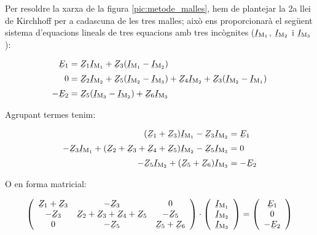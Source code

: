 Per resoldre la xarxa de la figura \vref{pic:metode_malles}, hem de plantejar la 2a llei de Kirchhoff per a cadascuna de les tres malles; això ens proporcionarà el següent sistema d'equacions lineals de tres equacions amb tres incògnites ($\cmplx{I}\ped{M_1}$, $\cmplx{I}\ped{M_2}$ i $\cmplx{I}\ped{M_3}$):

\begin{subequations}
\begin{align}
    \cmplx{E}_1 &= \cmplx{Z}_1 \cmplx{I}\ped{M_1} + \cmplx{Z}_3 (\cmplx{I}\ped{M_1}-\cmplx{I}\ped{M_2}) \\[0.5ex]
    0 &= \cmplx{Z}_2 \cmplx{I}\ped{M_2} + \cmplx{Z}_5(\cmplx{I}\ped{M_2}-\cmplx{I}\ped{M_3}) + \cmplx{Z}_4 \cmplx{I}\ped{M_2} + \cmplx{Z}_3(\cmplx{I}\ped{M_2}-\cmplx{I}\ped{M_1}) \\[0.5ex]
    -\cmplx{E}_2 &=  \cmplx{Z}_5 (\cmplx{I}\ped{M_3}-\cmplx{I}\ped{M_2})+\cmplx{Z}_6 \cmplx{I}\ped{M_3}
\end{align}
\end{subequations}

Agrupant termes tenim:

\begin{subequations}
\begin{align}
    (\cmplx{Z}_1 + \cmplx{Z}_3) \cmplx{I}\ped{M_1} - \cmplx{Z}_3 \cmplx{I}\ped{M_2} &= \cmplx{E}_1 \\[0.5ex]
    -\cmplx{Z}_3 \cmplx{I}\ped{M_1} + (\cmplx{Z}_2 + \cmplx{Z}_3+ \cmplx{Z}_4+ \cmplx{Z}_5)\cmplx{I}\ped{M_2} - \cmplx{Z}_5 \cmplx{I}\ped{M_3} &= 0 \\[0.5ex]
     -\cmplx{Z}_5 \cmplx{I}\ped{M_2} +  (\cmplx{Z}_5 + \cmplx{Z}_6) \cmplx{I}\ped{M_3} &= -\cmplx{E}_2
\end{align}
\end{subequations}

O en forma matricial:

\begin{equation}\label{eq:malles-mat}
  \left(
    \begin{array}{ccc}
      \cmplx{Z}_1 + \cmplx{Z}_3 & -\cmplx{Z}_3 & 0 \\
      -\cmplx{Z}_3 & \cmplx{Z}_2 + \cmplx{Z}_3+ \cmplx{Z}_4+ \cmplx{Z}_5 & -\cmplx{Z}_5 \\
      0 & -\cmplx{Z}_5 & \cmplx{Z}_5 + \cmplx{Z}_6 \\
    \end{array}
  \right)
  \cdot
  \left(
      \begin{array}{c}
        \cmplx{I}\ped{M_1} \\
        \cmplx{I}\ped{M_2} \\
        \cmplx{I}\ped{M_3} \\
      \end{array}
  \right)
  =
  \left(
      \begin{array}{c}
        \cmplx{E}_1 \\
        0 \\
        -\cmplx{E}_2 \\
      \end{array}
  \right)
\end{equation}

